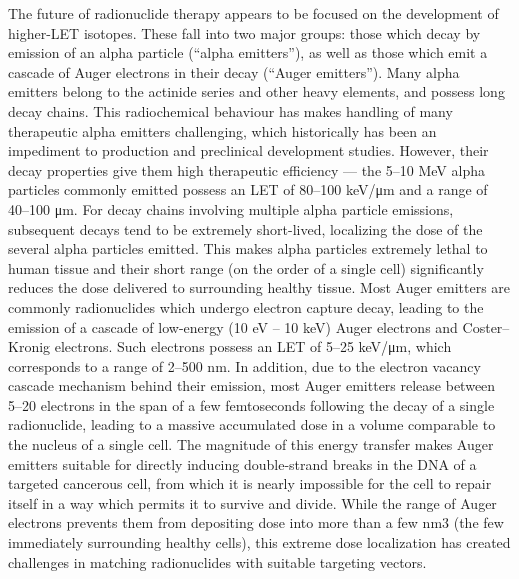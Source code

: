 The future of radionuclide therapy appears to be focused on the development of higher-LET isotopes. These fall into two major groups: those which decay by emission of an alpha particle (“alpha emitters”), as well as those which emit a cascade of Auger electrons in their decay (“Auger emitters”).  Many alpha emitters belong to the actinide series and other heavy elements, and possess long decay chains. This radiochemical behaviour has makes handling of many therapeutic alpha emitters challenging, which historically has been an impediment to production and preclinical development studies. However, their decay properties give them high therapeutic efficiency — the 5–10 MeV alpha particles commonly emitted possess an LET of 80–100 keV/μm and a range of 40–100 μm. For decay chains involving multiple alpha particle emissions, subsequent decays tend to be extremely short-lived, localizing the dose of the several alpha particles emitted. This makes alpha particles extremely lethal to human tissue and their short range (on the order of a single cell) significantly reduces the dose delivered to surrounding healthy tissue. Most Auger emitters are commonly radionuclides which undergo electron capture decay, leading to the emission of a cascade of low-energy (10 eV – 10 keV) Auger electrons and Coster–Kronig electrons. Such electrons possess an LET of 5–25 keV/μm, which corresponds to a range of 2–500 nm. In addition, due to the electron vacancy cascade mechanism behind their emission, most Auger emitters release between 5–20 electrons in the span of a few femtoseconds following the decay of a single radionuclide, leading to a massive accumulated dose in a volume comparable to the nucleus of a single cell. The magnitude of this energy transfer makes Auger emitters suitable for directly inducing double-strand breaks in the DNA of a targeted cancerous cell, from which it is nearly impossible for the cell to repair itself in a way which permits it to survive and divide.  While the range of Auger electrons prevents them from depositing dose into more than a few nm3 (the few immediately surrounding healthy cells), this extreme dose localization has created challenges in matching radionuclides with suitable targeting vectors.

